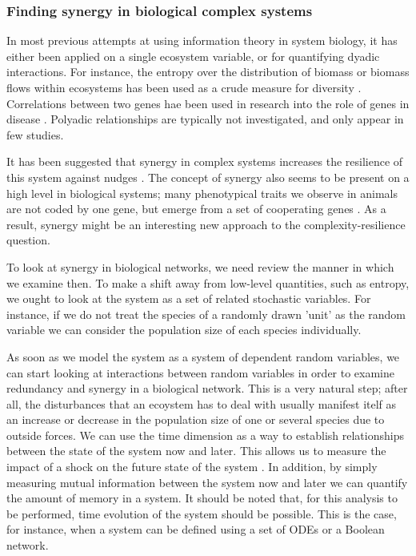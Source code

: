 \documentclass[../main.tex]{subfiles}
\begin{document}
\subsubsection{Finding synergy in biological complex systems}

In most previous attempts at using information theory in system biology, it has either been applied on a single ecosystem variable, or for quantifying dyadic interactions.
For instance, the entropy over the distribution of biomass or biomass flows within ecosystems has been used as a crude measure for diversity \cite{ulanowicz2009quantifying}.
Correlations between two genes hae been used in research into the role of genes in disease \cite{lu2004gene}.
Polyadic relationships are typically not investigated, and only appear in few studies.

It has been suggested that synergy in complex systems increases the resilience of this system against nudges \cite{quax2017quantifying}.
The concept of synergy also seems to be present on a high level in biological systems; many phenotypical traits we observe in animals are not coded by one gene, but emerge from a set of cooperating genes \cite{griffith2014quantifying}.
As a result, synergy might be an interesting new approach to the complexity-resilience question.

To look at synergy in biological networks, we need review the manner in which we examine then.
To make a shift away from low-level quantities, such as entropy, we ought to look at the system as a set of related stochastic variables.
For instance, if we do not treat the species of a randomly drawn 'unit' as the random variable we can consider the population size of each species individually.

As soon as we model the system as a system of dependent random variables, we can start looking at interactions between random variables in order to examine redundancy and synergy in a biological network.
This is a very natural step; after all, the disturbances that an ecoystem has to deal with usually manifest itelf as an increase or decrease in the population size of one or several species due to outside forces.
We can use the time dimension as a way to establish relationships between the state of the system now and later.
This allows us to measure the impact of a shock on the future state of the system \cite{QuaxPersonal}.
In addition, by simply measuring mutual information between the system now and later we can quantify the amount of memory in a system.
It should be noted that, for this analysis to be performed, time evolution of the system should be possible.
This is the case, for instance, when a system can be defined using a set of ODEs or a Boolean network.
\end{document}
